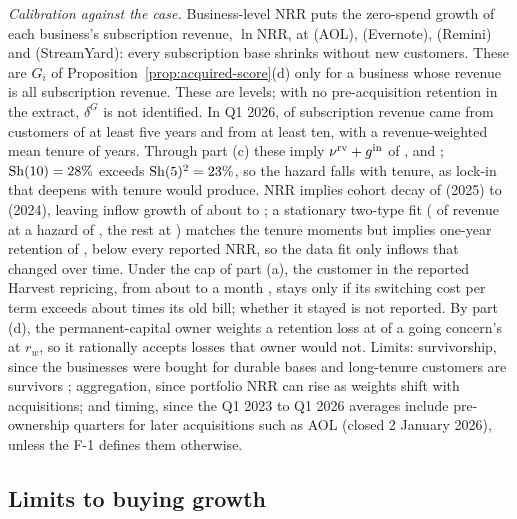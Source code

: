 \noindent\emph{Calibration against the case.} Business-level NRR puts the zero-spend growth of each business's subscription revenue, $\ln\mathrm{NRR}$, at \acqGiAol{} (AOL), \acqGiEvernote{} (Evernote), \acqGiRemini{} (Remini) and \acqGiStreamyard{} (StreamYard): every subscription base shrinks without new customers. These are $G_i$ of Proposition~\ref{prop:acquired-score}(d) only for a business whose revenue is all subscription revenue. These are levels; with no pre-acquisition retention in the extract, $\delta^G$ is not identified. In Q1 2026, \acqTenFive{} of subscription revenue came from customers of at least five years and \acqTenTen{} from at least ten, with a revenue-weighted mean tenure of \acqTenMean{} years. Through part (c) these imply $\nu^{\rm rv}+g^{\rm in}$ of \acqHazFive, \acqHazTen{} and \acqHazMean; $\mathrm{Sh}(10)=28\%$ exceeds $\mathrm{Sh}(5)^2=23\%$, so the hazard falls with tenure, as lock-in that deepens with tenure would produce. NRR implies cohort decay of \acqNuTwentyFive{} (2025) to \acqNuTwentyFour{} (2024), leaving inflow growth of about \acqGinLo{} to \acqGinHi; a stationary two-type fit (\acqMixW{} of revenue at a hazard of \acqMixFast, the rest at \acqMixSlow) matches the tenure moments but implies one-year retention of \acqMixNrr, below every reported NRR, so the data fit only inflows that changed over time. Under the cap of part (a), the customer in the reported Harvest repricing, from about \acqHarvestOld{} to \acqHarvestNew{} a month \citep{subscriptioninsider2026harvest}, stays only if its switching cost per term exceeds about \acqHarvestMult{} times its old bill; whether it stayed is not reported. By part (d), the permanent-capital owner weights a retention loss at \acqXgRatio{} of a going concern's at $r_w$, so it rationally accepts losses that owner would not. Limits: survivorship, since the businesses were bought for durable bases and long-tenure customers are survivors \citep{brown1992survivorship}; aggregation, since portfolio NRR can rise as weights shift with acquisitions; and timing, since the Q1 2023 to Q1 2026 averages include pre-ownership quarters for later acquisitions such as AOL (closed 2 January 2026), unless the F-1 defines them otherwise.

\subsection{Limits to buying growth}\label{sec:acq-limits}


